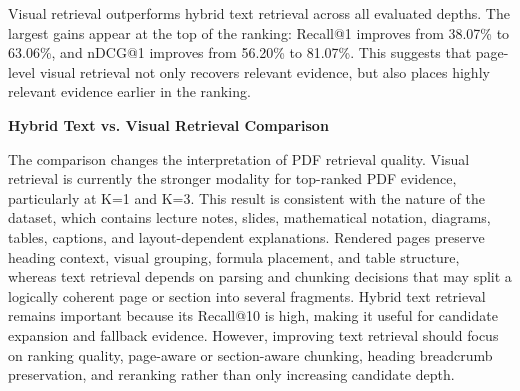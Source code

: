 Visual retrieval outperforms hybrid text retrieval across all evaluated depths. The largest gains appear at the top of the ranking: Recall@1 improves from 38.07\% to 63.06\%, and nDCG@1 improves from 56.20\% to 81.07\%. This suggests that page-level visual retrieval not only recovers relevant evidence, but also places highly relevant evidence earlier in the ranking.

\textbf{Hybrid Text vs. Visual Retrieval Comparison}

\begin{table}[H]
    \centering
    \caption{Hybrid Text and Visual Retrieval Comparison}
    \label{tab:hybrid_text_visual_comparison}
\end{table}

The comparison changes the interpretation of PDF retrieval quality. Visual retrieval is currently the stronger modality for top-ranked PDF evidence, particularly at K=1 and K=3. This result is consistent with the nature of the dataset, which contains lecture notes, slides, mathematical notation, diagrams, tables, captions, and layout-dependent explanations. Rendered pages preserve heading context, visual grouping, formula placement, and table structure, whereas text retrieval depends on parsing and chunking decisions that may split a logically coherent page or section into several fragments. Hybrid text retrieval remains important because its Recall@10 is high, making it useful for candidate expansion and fallback evidence. However, improving text retrieval should focus on ranking quality, page-aware or section-aware chunking, heading breadcrumb preservation, and reranking rather than only increasing candidate depth.

